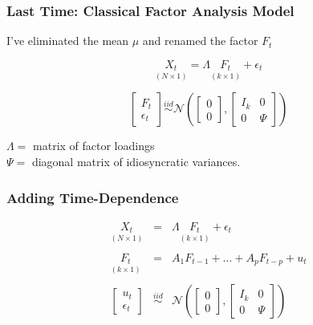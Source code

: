 \documentclass[handout]{beamer}
\begin{document}
\begin{frame}[c]\frametitle{Last Time: Classical Factor Analysis Model}
    

\alert{I've eliminated the mean $\mu$ and renamed the factor $F_t$}

\vspace{1em}
$$\underset{(N\times 1)}{X_t} =  \Lambda \underset{(k\times 1)}{F_t} + \epsilon_t$$

\vspace{2em}

\small

$$
\left[ \begin{array}
	{c} F_t \\ \epsilon_t
\end{array}\right]
\overset{iid}{\sim} \mathcal{N}\left(
\left[ \begin{array}
	{c} 0\\ 0 
\end{array}\right],
\left[ \begin{array}
	{cc} I_k & 0\\
	0 & \Psi
\end{array}\right]\right)$$
\vspace{1em}

$\Lambda = $ matrix of factor loadings\\
$\Psi = $ diagonal matrix of idiosyncratic variances.
\end{frame}
\begin{frame}
	\frametitle{Adding Time-Dependence}

\begin{eqnarray*}
	\underset{(N\times 1)}{X_t} &=&  \Lambda \underset{(k\times 1)}{F_t} + \epsilon_t \\ \\
	\underset{(k\times 1)}{F_t} &=& A_1 F_{t-1} + \hdots + A_p F_{t-p} + u_t \\ \\
	\left[ \begin{array}
	{c} u_t \\ \epsilon_t
\end{array}\right]
&\overset{iid}{\sim}& \mathcal{N}\left(
\left[ \begin{array}
	{c} 0\\ 0 
\end{array}\right],
\left[ \begin{array}
	{cc} I_k & 0\\
	0 & \Psi
\end{array}\right]\right)
\end{eqnarray*}	


\end{frame}
\end{document}
